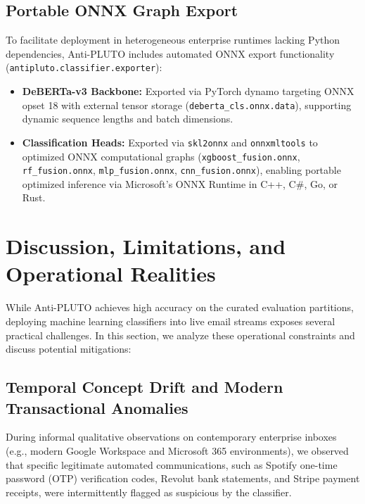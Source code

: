 \documentclass[journal]{IEEEtran}
\begin{document}
\subsection{Portable ONNX Graph Export}
To facilitate deployment in heterogeneous enterprise runtimes lacking Python dependencies, Anti-PLUTO includes automated ONNX export functionality (\texttt{antipluto.classifier.exporter}):
\begin{itemize}
    \item \textbf{DeBERTa-v3 Backbone:} Exported via PyTorch dynamo targeting ONNX opset 18 with external tensor storage (\texttt{deberta\_cls.onnx.data}), supporting dynamic sequence lengths and batch dimensions.
    \item \textbf{Classification Heads:} Exported via \texttt{skl2onnx} and \texttt{onnxmltools} to optimized ONNX computational graphs (\texttt{xgboost\_fusion.onnx}, \texttt{rf\_fusion.onnx}, \texttt{mlp\_fusion.onnx}, \texttt{cnn\_fusion.onnx}), enabling portable optimized inference via Microsoft's ONNX Runtime in C++, C\#, Go, or Rust.
\end{itemize}

\section{Discussion, Limitations, and Operational Realities}
\label{sec:discussion}

While Anti-PLUTO achieves high accuracy on the curated evaluation partitions, deploying machine learning classifiers into live email streams exposes several practical challenges. In this section, we analyze these operational constraints and discuss potential mitigations:

\subsection{Temporal Concept Drift and Modern Transactional Anomalies}
During informal qualitative observations on contemporary enterprise inboxes (e.g., modern Google Workspace and Microsoft 365 environments), we observed that specific legitimate automated communications, such as Spotify one-time password (OTP) verification codes, Revolut bank statements, and Stripe payment receipts, were intermittently flagged as suspicious by the classifier. 
\end{document}

